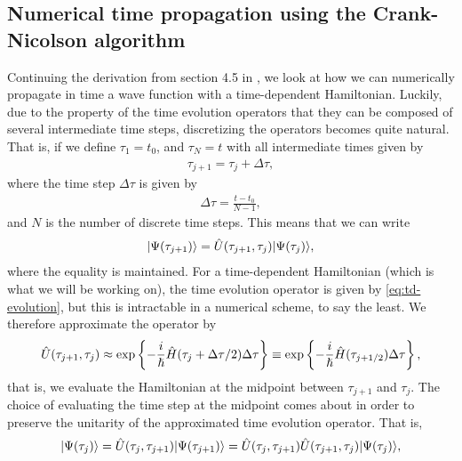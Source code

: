     \subsection{Numerical time propagation using the Crank-Nicolson algorithm}
        Continuing the derivation from section 4.5 in
        \citeauthor{ullrich2011time}, we look at how we can numerically
        propagate in time a wave function with a time-dependent Hamiltonian.
        Luckily, due to the property of the time evolution operators that they
        can be composed of several intermediate time steps, discretizing the
        operators becomes quite natural. That is, if we define $\tau_1 = t_0$,
        and $\tau_N = t$ with all intermediate times given by
        \begin{align}
            \tau_{j + 1} = \tau_j + \Delta \tau,
        \end{align}
        where the time step $\Delta \tau$ is given by
        \begin{align}
            \Delta \tau = \frac{t - t_0}{N - 1},
        \end{align}
        and $N$ is the number of discrete time steps. This means that we can
        write
        \begin{align}
            | \Psi(\tau_{j + 1}) \rangle
            = \hat{U}(\tau_{j + 1}, \tau_{j})| \Psi(\tau_j) \rangle,
        \end{align}
        where the equality is maintained. For a time-dependent Hamiltonian
        (which is what we will be working on), the time evolution operator is
        given by \autoref{eq:td-evolution}, but this is intractable in a
        numerical scheme, to say the least. We therefore approximate the
        operator by
        \begin{align}
            \hat{U}(\tau_{j + 1}, \tau_{j})
            \approx \exp\left\{ 
                -\frac{i}{\hslash}\hat{H}(\tau_{j} + \Delta\tau/2)\Delta\tau
             \right\}
            \equiv
            \exp\left\{ 
                -\frac{i}{\hslash}\hat{H}(\tau_{j + 1/2})\Delta\tau
             \right\},
        \end{align}
        that is, we evaluate the Hamiltonian at the midpoint between $\tau_{j +
        1}$ and $\tau_{j}$. The choice of evaluating the time step at the
        midpoint comes about in order to preserve the unitarity of the
        approximated time evolution operator. That is,
        \begin{align}
            | \Psi(\tau_j) \rangle
            = \hat{U}(\tau_j, \tau_{j + 1})| \Psi(\tau_{j + 1}) \rangle
            = \hat{U}(\tau_j, \tau_{j + 1})\hat{U}(\tau_{j + 1}, \tau_j)
            | \Psi(\tau_j) \rangle,
        \end{align}
